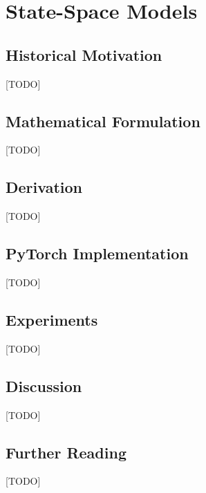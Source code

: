 
\chapter{State-Space Models}
\label{ch:12_state_space_models}


\section{Historical Motivation}
[TODO]

\section{Mathematical Formulation}
[TODO]

\section{Derivation}
[TODO]

\section{PyTorch Implementation}
[TODO]

\section{Experiments}
[TODO]

\section{Discussion}
[TODO]

\section{Further Reading}
[TODO]
